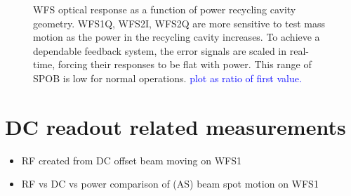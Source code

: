 \begin{figure}
\begin{centering}
\caption[Measured dependence of the WFS error signals on the power
recycling cavity geometry]{WFS optical response as a function of power
  recycling cavity geometry. WFS1Q, WFS2I, WFS2Q are more sensitive to
  test mass motion as the power in the recycling cavity increases. To
  achieve a dependable feedback system, the error signals are scaled
  in real-time, forcing their responses to be flat with power. This
  range of SPOB is low for normal operations. \textcolor{blue}{plot as
  ratio of first value.}}
\label{fig:WFStrack}
\end{centering}
\end{figure}






\section{DC readout related measurements}
\begin{itemize}
\item RF created from DC offset beam moving on WFS1
\item RF vs DC vs power comparison of (AS) beam spot motion on WFS1
\end{itemize}






